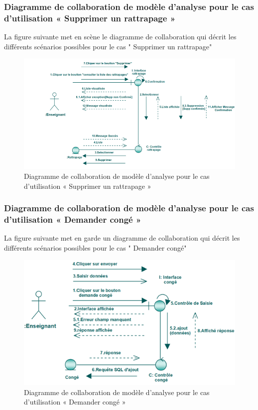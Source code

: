 \documentclass[12 pt ]{report}
\begin{document}
\subsubsection{Diagramme  de  collaboration  de  modèle  d'analyse  pour  le  cas  d'utilisation « Supprimer un rattrapage »  }
La figure suivante met en scène le diagramme de collaboration qui décrit les différents
scénarios possibles pour le cas " Supprimer un rattrapage"
\begin{figure}[h]
\begin{center}
\includegraphics[width= 14 cm , height =6 cm]{colla_ens_supprimerrattrapage.png}
 \caption{Diagramme  de  collaboration  de  modèle  d'analyse  pour  le  cas  d'utilisation « Supprimer un rattrapage »}
\end{center}
\end{figure} 
\subsubsection{Diagramme  de  collaboration  de  modèle  d'analyse  pour  le  cas  d'utilisation « Demander  congé »  }
La figure suivante met en garde un diagramme de collaboration qui décrit les différents
scénarios possibles pour le cas " Demander  congé"
\begin{figure}[h]
\begin{center}
\includegraphics[width= 14 cm , height =5.5 cm]{colla_ens_demandeconge.png}
 \caption{Diagramme  de  collaboration  de  modèle  d'analyse  pour  le  cas  d'utilisation « Demander  congé »}
\end{center}
\end{figure}
\end{document}
